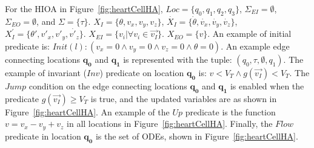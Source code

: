 For the \ac{HIOA} in Figure~\ref{fig:heartCellHA},
$Loc=\{q_{0},q_{1},q_{2},q_{3}\}$, $\Sigma_{EI} = \emptyset$,
$\Sigma_{EO}=\emptyset$, and
$\Sigma=\{\tau\}$. \mbox{$X_{I}=\{\theta,v_{x},v_{y},v_{z}\}$},
\mbox{$\dot{X_{I}}=\{\dot{\theta},\dot{v_{x}},\dot{v_{y}},\dot{v_{z}}\}$},
\mbox{$X^{\prime}_{I}=\{\theta',{v'_{x}},{v'_{y}},\dot{v'_{z}}\}$}.
$X_{EI}=\{v_{i}| \forall v_{i} \in \vec{v_{I}}\}$. $X_{EO}=\{v\}$. An
example of initial predicate is: 
\mbox{$Init(l): (v_{x}=0 \wedge v_{y}=0 \wedge v_{z}=0 \wedge \theta=0)$}. An
example edge connecting locations $\mathbf{q_{0}}$ and $\mathbf{q_{1}}$ is 
represented
with the tuple: $(q_{0},\tau,\emptyset,q_{1})$. The example of invariant
($Inv$) predicate on location $\mathbf{q_{0}}$ is: $v < V_T \wedge 
g(\vec{v_{I}}) < V_T$. The $Jump$ 
condition on
the edge connecting locations $\mathbf{q_{0}}$ and $\mathbf{q_{1}}$ is enabled 
when the
predicate \mbox{$g(\vec{v_{I}}) \geq V_{T}$} is true, and the updated
variables are as shown in Figure~\ref{fig:heartCellHA}. An example of
the $Up$ predicate is the function $v = v_{x} - v_{y} + v_{z}$ in all
locations in Figure~\ref{fig:heartCellHA}. Finally, the $Flow$ predicate
in location $\mathbf{q_{0}}$ is the set of \acp{ODE}, shown in 
Figure~\ref{fig:heartCellHA}.




